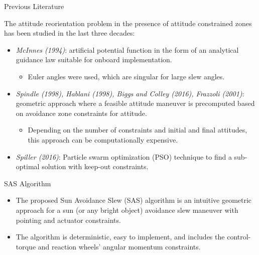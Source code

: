 \documentclass{beamer}
\begin{document}
\begin{frame}
\begin{block}{Previous Literature}
	
	The attitude reorientation problem in the presence of attitude constrained zones has been studied in the last three decades:
	\begin{itemize} 
		
		\item \textit{McInnes (1994)}: artificial potential function in the form of an analytical guidance law suitable for onboard implementation. 
		\begin{itemize}
			\item Euler angles were used, which are singular for large slew angles. 
		\end{itemize}
		\item \textit{Spindle (1998), Hablani (1998), Biggs and Colley (2016), Frazzoli (2001)}: geometric approach where a feasible attitude maneuver is precomputed based on avoidance zone constraints for attitude. 
		\begin{itemize}
			\item Depending on the number of constraints and initial and final attitudes, this approach can be computationally expensive. 
		\end{itemize}
		\item \textit{Spiller (2016)}: Particle swarm optimization (PSO) technique to find a sub-optimal solution with keep-out constraints. 
	\end{itemize} 

\end{block}
\end{frame}
\begin{frame}
\begin{block}{SAS Algorithm}
	\begin{itemize}
	\item The proposed Sun Avoidance Slew (SAS) algorithm is an intuitive geometric approach for a sun (or any bright object) avoidance slew maneuver with pointing and actuator constraints.
	\item The algorithm is deterministic, easy to implement, and includes the control-torque and reaction wheels' angular momentum constraints. 
	\end{itemize}
\end{block}
\end{frame}
\end{document}
